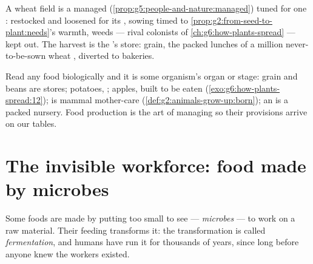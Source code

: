 \begin{example}\label{ex:g6:producing-our-food:wheat}
A wheat field is a managed 
(\cref{prop:g5:people-and-nature:managed}) tuned for one
:  restocked and loosened for its ,
sowing timed to \cref{prop:g2:from-seed-to-plant:needs}'s
warmth, weeds --- rival colonists of
\cref{ch:g6:how-plants-spread} --- kept out. The harvest is
the 's  store: grain, the packed lunches of a
million never-to-be-sown wheat , diverted to bakeries.
\end{example}

\begin{remark}\label{rem:g6:producing-our-food:stage}
Read any food biologically and it is some organism's organ
or stage: grain and beans are  stores; potatoes, ;
apples,  built to be eaten
(\cref{exo:g6:how-plants-spread:12});  is mammal
mother-care (\cref{def:g2:animals-grow-up:born}); an  is
a packed nursery. Food production is the art of managing
 so their provisions arrive on our tables.
\end{remark}

\section{The invisible workforce: food made by microbes}

\begin{definition}[Fermentation]\label{def:g6:producing-our-food:fermentation}
Some foods are made by putting  too small to
see --- \emph{microbes} --- to work on
a raw material. Their feeding transforms it: the
transformation is called
\emph{fermentation}, and humans have run
it for thousands of years, since long before anyone knew
the workers existed.
\end{definition}

